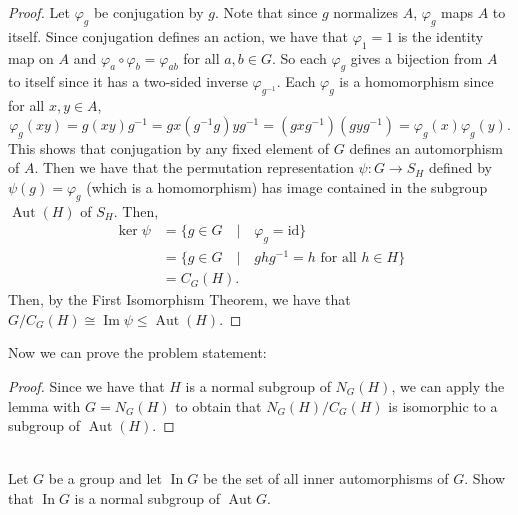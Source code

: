 \documentclass{article}
\begin{document}
\begin{proof}
    Let $\varphi_g$ be conjugation by $g$. Note that since $g$ normalizes $A$, $\varphi_g$ maps $A$ to itself. Since conjugation defines an action, we have that $\varphi_1 = 1$ is the identity map on $A$ and $\varphi_a \circ \varphi_b = \varphi_{ab}$ for all $a, b \in G$. So each $\varphi_g$ gives a bijection from $A$ to itself since it has a two-sided inverse $\varphi_{g^{-1}}$. Each $\varphi_g$ is a homomorphism since for all $x, y \in A$,
   \[
        \varphi_g(xy) = g(xy)g^{-1} = gx(g^{-1}g)yg^{-1} = (gxg^{-1})(gyg^{-1}) = \varphi_g(x)\varphi_g(y).
   \]
    This shows that conjugation by any fixed element of $G$ defines an automorphism of $A$. Then we have that the permutation representation $\psi : G \to S_H$ defined by $\psi(g) = \varphi_g$ (which is a homomorphism) has image contained in the subgroup $\operatorname{Aut}(H)$ of $S_H$. Then,
    \begin{align*}
        \ker \psi &= \{ g \in G \quad | \quad \varphi_g = \text{id} \} \\
        &= \{ g \in G \quad | \quad ghg^{-1} = h \text{ for all } h \in H \} \\
        &= C_G(H).
    \end{align*}
    Then, by the First Isomorphism Theorem, we have that $G / C_G(H) \cong \operatorname{Im} \psi \leq \operatorname{Aut}(H)$.
\end{proof}

Now we can prove the problem statement: \\
\begin{proof}
    Since we have that $H$ is a normal subgroup of $N_G(H)$, we can apply the lemma with $G = N_G(H)$ to obtain that $N_G(H) / C_G(H)$ is isomorphic to a subgroup of $\operatorname{Aut}(H)$.
\end{proof}



\begin{problem}[II.4.7] \\
    Let $G$ be a group and let $\operatorname{In} G$ be the set of all inner automorphisms of $G$. Show that $\operatorname{In} G$ is a normal subgroup of $\operatorname{Aut} G$.
\end{problem}
\end{document}
